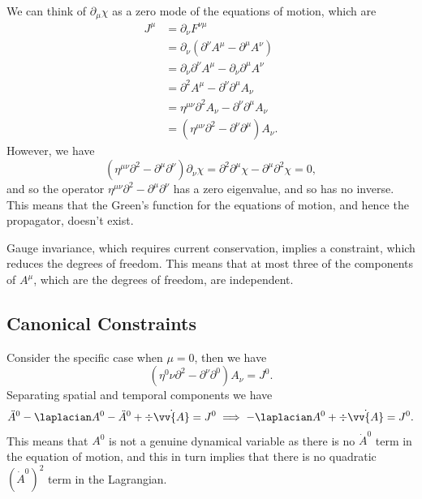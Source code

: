 \documentclass[fleqn]{NotesClass}
\newcommand{\minkowskiMetric}{\eta}
\newcommand{\dalembertian}{\partial^2}
\begin{document}
    We can think of \(\partial_\mu \chi\) as a zero mode of the equations of motion, which are
    \begin{align}
        J^\mu &= \partial_\nu F^{\nu\mu}\\
        &= \partial_\nu (\partial^\nu A^\mu - \partial^\mu A^\nu)\\
        &= \partial_\nu \partial^\nu A^\mu - \partial_\nu\partial^\mu A^\nu\\
        &= \dalembertian A^\mu - \partial^\nu \partial^\mu A_\nu\\
        &= \minkowskiMetric^{\mu\nu} \dalembertian A_\nu - \partial^\nu \partial^\mu A_\nu\\
        &= (\minkowskiMetric^{\mu\nu} \dalembertian - \partial^\nu \partial^\mu) A_\nu.
    \end{align}
    However, we have
    \begin{equation}
        (\minkowskiMetric^{\mu\nu} \dalembertian - \partial^\mu \partial^\nu)\partial_\nu \chi = \dalembertian \partial^\mu \chi - \partial^\mu \dalembertian \chi = 0,
    \end{equation}
    and so the operator \(\minkowskiMetric^{\mu\nu} \dalembertian - \partial^\mu \partial^\nu\) has a zero eigenvalue, and so has no inverse.
    This means that the Green's function for the equations of motion, and hence the propagator, doesn't exist.
    
    Gauge invariance, which requires current conservation, implies a constraint, which reduces the degrees of freedom.
    This means that at most three of the components of \(A^\mu\), which are the degrees of freedom, are independent.
    
    \subsection{Canonical Constraints}
    Consider the specific case when \(\mu = 0\), then we have
    \begin{equation}
        (\minkowskiMetric^0\nu \dalembertian - \partial^\nu \partial^0)A_\nu = J^0.
    \end{equation}
    Separating spatial and temporal components we have
    \begin{equation}
        \ddot{A}^0 - \laplacian A^0 - \ddot{A}^0 + \div \dot{\vv{A}} = J^0 \implies -\laplacian A^0 + \div\dot{\vv{A}} = J^0.
    \end{equation}
    This means that \(A^0\) is not a genuine dynamical variable as there is no \(\dot{A}^0\) term in the equation of motion, and this in turn implies that there is no quadratic \((\dot{A}^0)^2\) term in the Lagrangian.
    
\end{document}
